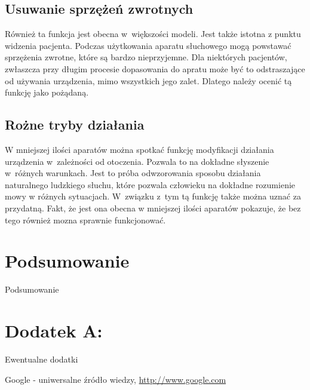 \documentclass[journal]{IEEEtran}
\begin{document}
\subsection{Usuwanie sprzężeń zwrotnych}

Również ta funkcja jest obecna w~większości modeli. Jest także istotna z punktu widzenia pacjenta. Podczas użytkowania aparatu słuchowego mogą powstawać sprzężenia zwrotne, które są bardzo nieprzyjemne. Dla niektórych pacjentów, zwłaszcza przy długim procesie dopasowania do apratu może być to odstraszające od używania urządzenia, mimo wszystkich jego zalet. Dlatego należy ocenić tą funkcję jako pożądaną. 

\subsection{Rożne tryby działania}

W mniejszej ilości aparatów można spotkać funkcję modyfikacji działania urządzenia w~zależności od otoczenia. Pozwala to na dokładne słyszenie w~różnych warunkach. Jest to próba odwzorowania sposobu działania naturalnego ludzkiego słuchu, które pozwala człowieku na dokładne rozumienie mowy w różnych sytuacjach. W~związku z~tym tą funkcję także można uznać za przydatną. Fakt, że jest ona obecna w mniejszej ilości aparatów pokazuje, że bez tego również mozna sprawnie funkcjonować.



\section{Podsumowanie}

Podsumowanie

\section{Dodatek A: }

Ewentualne dodatki


\begin{thebibliography}{123}
    Google - uniwersalne źródło wiedzy,
        \url{http://www.google.com}
\end{thebibliography}
\end{document}
